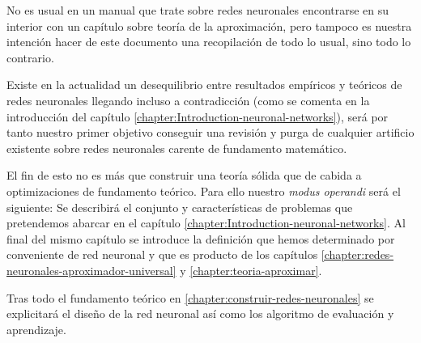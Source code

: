 
 
No es usual en un manual que trate sobre redes neuronales encontrarse en su interior con un 
capítulo sobre teoría de la aproximación, pero tampoco es nuestra intención
hacer de este documento una recopilación de todo lo usual, sino todo lo contrario.

Existe en la actualidad un desequilibrio entre resultados empíricos y teóricos de redes neuronales llegando incluso a contradicción (como se comenta en la introducción del capítulo \ref{chapter:Introduction-neuronal-networks}), será por tanto
nuestro primer objetivo conseguir una revisión y purga de cualquier artificio existente sobre redes neuronales carente de fundamento matemático. 

El fin de esto no es más que construir una teoría sólida que de cabida a optimizaciones de 
fundamento teórico.  Para ello nuestro \textit{modus operandi} será el siguiente: 
Se describirá el conjunto y características de problemas que pretendemos abarcar  en el capítulo \ref{chapter:Introduction-neuronal-networks}. Al final del mismo capítulo se introduce la definición que hemos determinado por conveniente de red neuronal y que es producto de los capítulos \ref{chapter:redes-neuronales-aproximador-universal}
y \ref{chapter:teoria-aproximar}.
 
Tras todo el fundamento teórico en \ref{chapter:construir-redes-neuronales} se explicitará el diseño de la red neuronal así como los algoritmo de evaluación y aprendizaje.